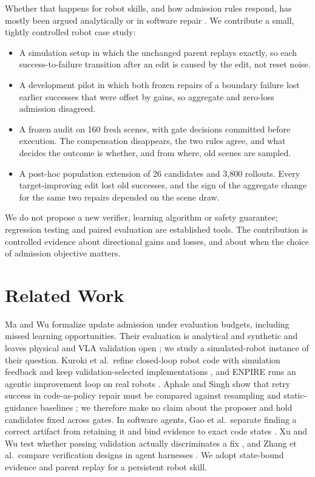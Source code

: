 \documentclass[letterpaper]{article} %
\begin{document}
Whether that happens for robot skills, and how admission rules respond, has mostly been argued analytically or in software repair \citep{ma2026validation,gao2026looping}. We contribute a small, tightly controlled robot case study:
\begin{itemize}
\item A simulation setup in which the unchanged parent replays exactly, so each success-to-failure transition after an edit is caused by the edit, not reset noise.
\item A development pilot in which both frozen repairs of a boundary failure lost earlier successes that were offset by gains, so aggregate and zero-loss admission disagreed.
\item A frozen audit on 160 fresh scenes, with gate decisions committed before execution. The compensation disappears, the two rules agree, and what decides the outcome is whether, and from where, old scenes are sampled.
\item A post-hoc population extension of 26 candidates and 3{,}800 rollouts. Every target-improving edit lost old successes, and the sign of the aggregate change for the same two repairs depended on the scene draw.
\end{itemize}
We do not propose a new verifier, learning algorithm or safety guarantee; regression testing and paired evaluation are established tools. The contribution is controlled evidence about directional gains and losses, and about when the choice of admission objective matters.

\section{Related Work}
Ma and Wu formalize update admission under evaluation budgets, including missed learning opportunities. Their evaluation is analytical and synthetic and leaves physical and VLA validation open \citep{ma2026validation}; we study a simulated-robot instance of their question. Kuroki et al.\ refine closed-loop robot code with simulation feedback and keep validation-selected implementations \citep{kuroki2026closedloop}, and ENPIRE runs an agentic improvement loop on real robots \citep{xiao2026enpire}. Aphale and Singh show that retry success in code-as-policy repair must be compared against resampling and static-guidance baselines \citep{aphale2026selfrepair}; we therefore make no claim about the proposer and hold candidates fixed across gates. In software agents, Gao et al.\ separate finding a correct artifact from retaining it and bind evidence to exact code states \citep{gao2026looping}. Xu and Wu test whether passing validation actually discriminates a fix \citep{xu2026evidence}, and Zhang et al.\ compare verification designs in agent harnesses \citep{zhang2026verification}. We adopt state-bound evidence and parent replay for a persistent robot skill.
\end{document}
